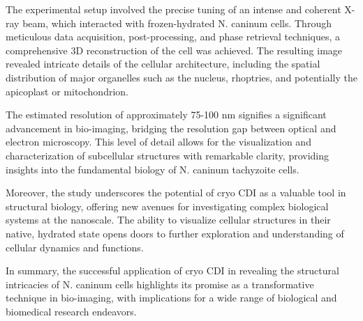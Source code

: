 \documentclass[12pt, a4paper, twocolumn]{article}
\begin{document}
The experimental setup involved the precise tuning of an intense and coherent X-ray beam, which interacted with frozen-hydrated N. caninum cells. Through meticulous data acquisition, post-processing, and phase retrieval techniques, a comprehensive 3D reconstruction of the cell was achieved. The resulting image revealed intricate details of the cellular architecture, including the spatial distribution of major organelles such as the nucleus, rhoptries, and potentially the apicoplast or mitochondrion.

The estimated resolution of approximately 75-100 nm signifies a significant advancement in bio-imaging, bridging the resolution gap between optical and electron microscopy. This level of detail allows for the visualization and characterization of subcellular structures with remarkable clarity, providing insights into the fundamental biology of N. caninum tachyzoite cells.

Moreover, the study underscores the potential of cryo CDI as a valuable tool in structural biology, offering new avenues for investigating complex biological systems at the nanoscale. The ability to visualize cellular structures in their native, hydrated state opens doors to further exploration and understanding of cellular dynamics and functions.

In summary, the successful application of cryo CDI in revealing the structural intricacies of N. caninum cells highlights its promise as a transformative technique in bio-imaging, with implications for a wide range of biological and biomedical research endeavors.



\newpage
\end{document}
